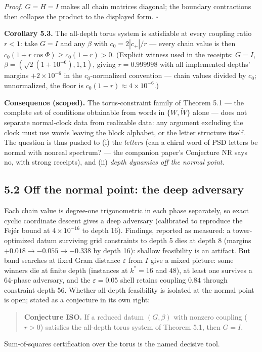 \documentclass[11pt]{article}
\begin{document}
\emph{Proof.}  $G = H = I$ makes all chain matrices diagonal; the boundary contractions then collapse the product to the displayed form.  $\square$

\textbf{Corollary 5.3.}  The all-depth torus system is satisfiable at every coupling ratio $r < 1$: take $G = I$ and any $\beta$ with $c_0 = 2|c_+|/r$ — every chain value is then $c_0(1 + r\cos\Phi) \ge c_0(1 - r) > 0$.  (Explicit witness used in the receipts: $G = I$, $\beta = (\sqrt2(1+10^{-6}), 1, 1)$, giving $r = 0.999998$ with all implemented depths' margins $+2\times 10^{-6}$ in the $c_0$-normalized convention — chain values divided by $c_0$; unnormalized, the floor is $c_0(1-r) \approx 4\times 10^{-6}$.)

\textbf{Consequence (scoped).}  The torus-constraint family of Theorem 5.1 — the complete set of conditions obtainable from words in $\{W, \widetilde W\}$ alone — does not separate normal-clock data from realizable data: any argument excluding the clock must use words leaving the block alphabet, or the letter structure itself. The question is thus pushed to (i) the \emph{letters} (can a chiral word of PSD letters be normal with nonreal spectrum? — the companion paper's Conjecture NR says no, with strong receipts), and (ii) \emph{depth dynamics off the normal point}.

\subsection*{5.2 Off the normal point: the deep adversary}
Each chain value is degree-one trigonometric in each phase separately, so exact cyclic coordinate descent gives a deep adversary (calibrated to reproduce the Fejér bound at $4\times 10^{-16}$ to depth 16).  Findings, reported as measured: a tower-optimized datum surviving grid constraints to depth 5 dies at depth 8 (margins $+0.018 \to -0.055 \to -0.338$ by depth 16): shallow feasibility is an artifact.  But band searches at fixed Gram distance $\varepsilon$ from $I$ give a mixed picture: some winners die at finite depth (instances at $k^* = 16$ and $48$), at least one survives a 64-phase adversary, and the $\varepsilon = 0.05$ shell retains coupling $0.84$ through constraint depth 56.  Whether all-depth feasibility is isolated at the normal point is open; stated as a conjecture in its own right:

\begin{quote}
\textbf{Conjecture ISO.}  If a reduced datum $(G, \beta)$ with nonzero coupling ($r > 0$) satisfies the all-depth torus system of Theorem 5.1, then $G = I$.
\end{quote}
Sum-of-squares certification over the torus is the named decisive tool.
\end{document}

